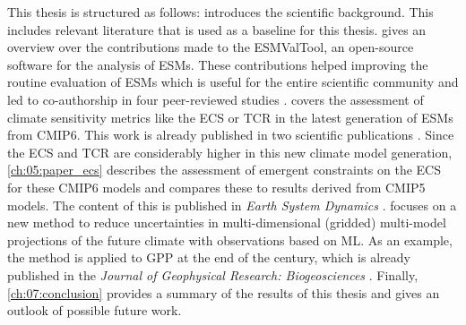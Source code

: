 This thesis is structured as follows: 
introduces the scientific background. This includes relevant literature that is
used as a baseline for this thesis.  gives an overview
over the contributions made to the \ac{ESMValTool}, an open-source software for
the analysis of \acp{ESM}. These contributions helped improving the routine
evaluation of \acp{ESM} which is useful for the entire scientific community and
led to co-authorship in four peer-reviewed studies \autocite{Eyring2020,
  Lauer2020, Righi2020, Weigel2020}. 
covers the assessment of climate sensitivity metrics like the \ac{ECS} or
\ac{TCR} in the latest generation of \acp{ESM} from \acs{CMIP}6. This work is
already published in two scientific publications \autocite{Bock2020,
  Meehl2020}. Since the \ac{ECS} and \ac{TCR} are considerably higher in this
new climate model generation, \cref{ch:05:paper_ecs} describes the assessment
of emergent constraints on the \ac{ECS} for these \acs{CMIP}6 models and
compares these to results derived from \acs{CMIP}5 models. The content of this
 is published in \emph{Earth System Dynamics}
\autocite{Schlund2020a}.  focuses on a new method to
reduce uncertainties in multi-dimensional (gridded) multi-model projections of
the future climate with observations based on \ac{ML}. As an example, the
method is applied to \ac{GPP} at the end of the  century, which is
already published in the \emph{Journal of Geophysical Research: Biogeosciences}
\autocite{Schlund2020}. Finally, \cref{ch:07:conclusion} provides a summary of
the results of this thesis and gives an outlook of possible future work.
